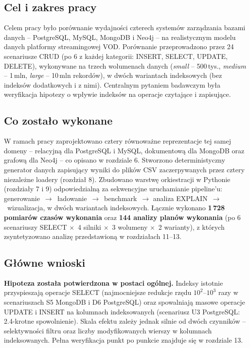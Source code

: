 \subsection{Cel i zakres pracy}

Celem pracy było porównanie wydajności czterech systemów zarządzania
bazami danych -- PostgreSQL, MySQL, MongoDB i Neo4j -- na realistycznym
modelu danych platformy streamingowej VOD. Porównanie przeprowadzono
przez 24 scenariusze CRUD (po 6 z każdej kategorii: INSERT, SELECT,
UPDATE, DELETE), wykonywane na trzech wolumenach danych
(\emph{small} -- 500\,tys., \emph{medium} -- 1\,mln, \emph{large} --
10\,mln rekordów), w dwóch wariantach indeksowych (bez indeksów
dodatkowych i z nimi). Centralnym pytaniem badawczym była weryfikacja
hipotezy o wpływie indeksów na operacje czytające i zapisujące.

\subsection{Co zostało wykonane}

W ramach pracy zaprojektowano cztery równoważne reprezentacje tej
samej domeny -- relacyjną dla PostgreSQL i MySQL, dokumentową dla
MongoDB oraz grafową dla Neo4j -- co opisano w rozdziale 6. Stworzono
deterministyczny generator danych zapisujący wyniki do plików CSV
zaczerpywanych przez cztery niezależne loadery (rozdział 8). Zbudowano
warstwę orkiestracji w Pythonie (rozdziały 7 i 9) odpowiedzialną za
sekwencyjne uruchamianie pipeline'u: generowanie~$\rightarrow$~ładowanie~$\rightarrow$~benchmark~$\rightarrow$
analiza EXPLAIN~$\rightarrow$~wizualizacja, w dwóch wariantach indeksowych.
Łącznie wykonano \textbf{1\,728 pomiarów czasów wykonania} oraz
\textbf{144 analizy planów wykonania} (po 6 scenariuszy SELECT
$\times$~4 silniki $\times$~3 wolumeny $\times$~2 warianty), z których
zsyntetyzowano analizę przedstawioną w rozdziałach 11--13.

\subsection{Główne wnioski}

\textbf{Hipoteza została potwierdzona w postaci ogólnej.} Indeksy
istotnie przyspieszają operacje SELECT (najmocniejsze redukcje rzędu
$10^2$--$10^3$ razy w scenariuszach S5 MongoDB i D6 PostgreSQL) oraz
spowalniają masowe operacje UPDATE i INSERT na kolumnach indeksowanych
(scenariusz U3 PostgreSQL: 2.4-krotne spowolnienie). Skala efektu
zależy jednak silnie od dwóch czynników -- selektywności filtru oraz
liczby modyfikowanych wierszy w kolumnach indeksowanych. Pełna
weryfikacja punkt po punkcie znajduje się w rozdziale 13.

